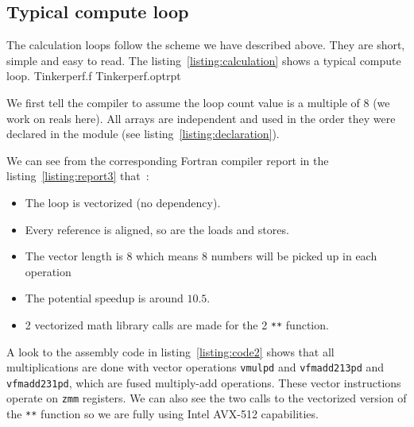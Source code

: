 \documentclass[9pt,comparison]{livecoms}
\newcommand{\lv}{\Large\verb}
\begin{document}
\subsection{Typical compute loop} 
\hspace{\parindent}The calculation loops follow the scheme we have described above. They are short, simple and easy to read. The listing~\ref{listing:calculation} shows a typical compute loop. 
 {Tinkerperf.f}
 {Tinkerperf.optrpt}

We first tell the compiler to assume the loop count value is a multiple of 8 (we work on reals here). All arrays are independent and used in the order they were declared in the module (see listing~\ref{listing:declaration}).%

We can see from the corresponding Fortran compiler report in the listing~\ref{listing:report3} that~:
\begin{itemize}
    \item The loop is vectorized (no dependency).
    \item Every reference is aligned, so are the loads and stores.
    \item The vector length is 8 which means 8 numbers will be picked up in each operation
    \item The potential speedup is around $10.5$.
    \item 2 vectorized math library calls are made for the 2 {\color{blue}\lv|**|} function.
\end{itemize}


A look to the assembly code in listing~\ref{listing:code2} shows that all multiplications are done with vector operations {\color{codegreen}\lv|vmulpd|} and {\color{codegreen}\lv|vfmadd213pd|} and {\color{codegreen}\lv|vfmadd231pd|}, which are fused multiply-add operations. These vector instructions operate on {\color{red}\lv|zmm|} registers. We can also see the two calls to the vectorized version of the {\color{blue}\lv|**|} function so we are fully using Intel AVX-512 capabilities.
\end{document}
